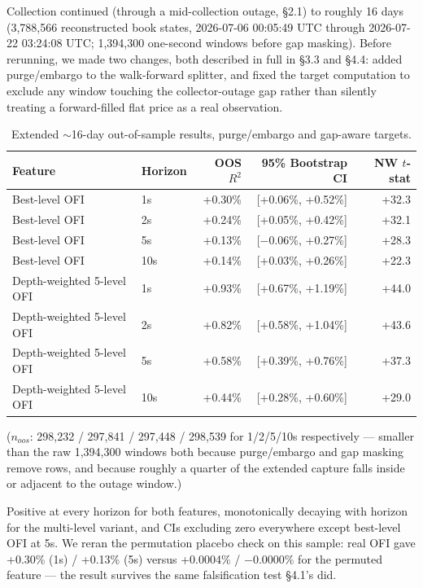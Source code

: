 \documentclass[11pt]{article}
\begin{document}
Collection continued (through a mid-collection outage, \S2.1) to roughly 16 days (3{,}788{,}566 reconstructed book states, 2026-07-06 00:05:49 UTC through 2026-07-22 03:24:08 UTC; 1{,}394{,}300 one-second windows before gap masking). Before rerunning, we made two changes, both described in full in \S3.3 and \S4.4: added purge/embargo to the walk-forward splitter, and fixed the target computation to exclude any window touching the collector-outage gap rather than silently treating a forward-filled flat price as a real observation.

\begin{table}[h]
\centering
\begin{tabular}{llrrr}
\toprule
Feature & Horizon & OOS $R^2$ & 95\% Bootstrap CI & NW $t$-stat \\
\midrule
Best-level OFI & 1s & +0.30\% & [+0.06\%, +0.52\%] & +32.3 \\
Best-level OFI & 2s & +0.24\% & [+0.05\%, +0.42\%] & +32.1 \\
Best-level OFI & 5s & +0.13\% & [$-$0.06\%, +0.27\%] & +28.3 \\
Best-level OFI & 10s & +0.14\% & [+0.03\%, +0.26\%] & +22.3 \\
Depth-weighted 5-level OFI & 1s & +0.93\% & [+0.67\%, +1.19\%] & +44.0 \\
Depth-weighted 5-level OFI & 2s & +0.82\% & [+0.58\%, +1.04\%] & +43.6 \\
Depth-weighted 5-level OFI & 5s & +0.58\% & [+0.39\%, +0.76\%] & +37.3 \\
Depth-weighted 5-level OFI & 10s & +0.44\% & [+0.28\%, +0.60\%] & +29.0 \\
\bottomrule
\end{tabular}
\caption{Extended $\sim$16-day out-of-sample results, purge/embargo and gap-aware targets.}
\end{table}

($n_{oos}$: 298{,}232 / 297{,}841 / 297{,}448 / 298{,}539 for 1/2/5/10s respectively --- smaller than the raw 1{,}394{,}300 windows both because purge/embargo and gap masking remove rows, and because roughly a quarter of the extended capture falls inside or adjacent to the outage window.)

Positive at every horizon for both features, monotonically decaying with horizon for the multi-level variant, and CIs excluding zero everywhere except best-level OFI at 5s. We reran the permutation placebo check on this sample: real OFI gave +0.30\% (1s) / +0.13\% (5s) versus +0.0004\% / $-$0.0000\% for the permuted feature --- the result survives the same falsification test \S4.1's did.
\end{document}
